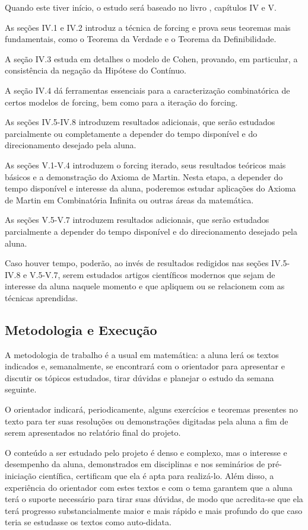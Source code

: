 \documentclass{article}
\begin{document}
    Quando este tiver início, o estudo será baseado no livro \cite{kunen2011set}, capítulos IV e V.

    As seções IV.1 e IV.2 introduz a técnica de forcing e prova seus teoremas mais fundamentais, como o Teorema da Verdade e o Teorema da Definibilidade.
    
    A seção IV.3 estuda em detalhes o modelo de Cohen, provando, em particular, a consistência da negação da Hipótese do Contínuo.

    A seção IV.4 dá ferramentas essenciais para a caracterização combinatórica de certos modelos de forcing, bem como para a iteração do forcing.

    As seções IV.5-IV.8 introduzem resultados adicionais, que serão estudados parcialmente ou completamente a depender do tempo disponível e do direcionamento desejado pela aluna.

    As seções V.1-V.4 introduzem o forcing iterado, seus resultados teóricos mais básicos e a demonstração do Axioma de Martin. Nesta etapa, a depender do tempo disponível e interesse da aluna, poderemos estudar aplicações do Axioma de Martin em Combinatória Infinita ou outras áreas da matemática.

    As seções V.5-V.7 introduzem resultados adicionais, que serão estudados parcialmente a depender do tempo disponível e do direcionamento desejado pela aluna.

    Caso houver tempo, poderão, ao invés de resultados redigidos nas seções IV.5-IV.8 e V.5-V.7, serem estudados artigos científicos modernos que sejam de interesse da aluna naquele momento e que apliquem ou se relacionem com as técnicas aprendidas.

    \subsection{Metodologia e Execução}
    A metodologia de trabalho é a usual em matemática: a aluna lerá os textos indicados e, semanalmente, se encontrará com o orientador para apresentar e discutir os tópicos estudados, tirar dúvidas e planejar o estudo da semana seguinte.

    O orientador indicará, periodicamente, alguns exercícios e teoremas presentes no texto para ter suas resoluções ou demonstrações digitadas pela aluna a fim de serem apresentados no relatório final do projeto.

    O conteúdo a ser estudado pelo projeto é denso e complexo, mas o interesse e desempenho da aluna, demonstrados em disciplinas e nos seminários de pré-iniciação científica, certificam que ela é apta para realizá-lo.
    Além disso, a experiência do orientador com estes textos e com o tema garantem que a aluna terá o suporte necessário para tirar suas dúvidas, de modo que acredita-se que ela terá progresso substancialmente maior e mais rápido e mais profundo do que caso teria se estudasse os textos como auto-didata.
\end{document}
